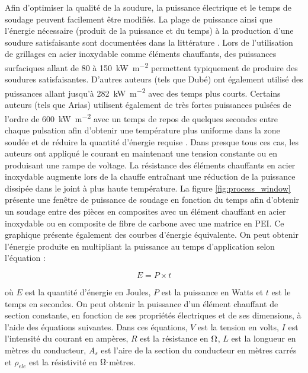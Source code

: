 \FloatBarrier
Afin d'optimiser la qualité de la soudure, la puissance électrique et le temps de soudage peuvent facilement être modifiés. 
La plage de puissance ainsi que l'énergie nécessaire (produit de la puissance et du temps) à la production d'une soudure satisfaisante sont documentées dans la littérature \cite{Hou1999a}. 
Lors de l'utilisation de grillages en acier inoxydable comme éléments chauffants, des puissances surfaciques allant de 80 à \SI[locale=FR]{150}{\kilo\watt\per\square\metre} permettent typiquement de produire des soudures satisfaisantes. 
D'autres auteurs (tels que Dubé) ont également utilisé des puissances allant jusqu'à \SI[locale=FR]{282}{\kilo\watt\per\square\metre} \cite{Dube2007} avec des temps plus courts. 
Certains auteurs (tels que Arias) utilisent également de très fortes puissances pulsées de l'ordre de \SI[locale=FR]{600}{\kilo\watt\per\square\metre} avec un temps de repos de quelques secondes entre chaque pulsation afin d'obtenir une température plus uniforme dans la zone soudée et de réduire la quantité d'énergie requise  \cite{Arias1996}. 
Dans presque tous ces cas, les auteurs ont appliqué le courant en maintenant une tension constante ou en produisant une rampe de voltage. 
La résistance des éléments chauffants en acier inoxydable augmente lors de la chauffe entraînant une réduction de la puissance dissipée dans le joint à plus haute température. 
La figure \ref{fig:process_window} présente une fenêtre de puissance de soudage en fonction du temps afin d'obtenir un soudage entre des pièces en composites avec un élément chauffant en acier inoxydable ou en composite de fibre de carbone avec une matrice en PEI. 
Ce graphique présente également des courbes d'énergie équivalente. 
On peut obtenir l'énergie produite en multipliant la puissance au temps d'application selon l'équation : 

\begin{equation}
E = P \times t
\end{equation}

où $E$ est la quantité d'énergie en Joules, $P$ est la puissance en Watts et $t$ est le temps en secondes. 
On peut obtenir la puissance d'un élément chauffant de section constante, en fonction de ses propriétés électriques et de ses dimensions, à l'aide des équations suivantes. Dans ces équations, $V$ est la tension en volts, $I$ est l'intensité du courant en ampères, $R$ est la résistance en $\ohm$, $L$ est la longueur en mètres du conducteur, $A_s$ est l'aire de la section du conducteur en mètres carrés et $\rho_{ele}$ est la résistivité en $\ohm \cdot$mètres. 

